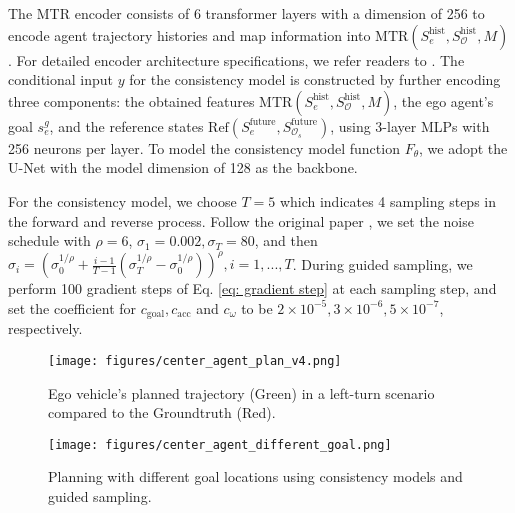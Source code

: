 The MTR encoder consists of 6 transformer layers with a dimension of 256 to encode agent trajectory histories and map information into $\text{MTR}(S_e^{\text{hist}}, S_\mathcal{O}^{\text{hist}}, M)$.
For detailed encoder architecture specifications, we refer readers to \cite{shi2022motion}.
The conditional input $y$ for the consistency model is constructed by further encoding three components: the obtained features $\text{MTR}(S_e^{\text{hist}}, S_\mathcal{O}^{\text{hist}}, M)$, the ego agent's goal $s_e^g$, and the reference states $\text{Ref}(S_e^{\text{future}}, S_{\mathcal{O}_s}^{\text{future}})$, using 3-layer MLPs with 256 neurons per layer.
To model the consistency model function $F_\theta$, we adopt the U-Net \citep{ronneberger2015u} with the model dimension of 128 as the backbone.

For the consistency model, we choose $T=5$ which indicates 4 sampling steps in the forward and reverse process.
Follow the original paper \citep{song2023improved}, we set the noise schedule with $\rho = 6$, $\sigma_1 = 0.002, \sigma_T=80$, and then $\sigma_i = \left(\sigma_{0}^{1/\rho} + \frac{i-1}{T-1}(\sigma_{T}^{1/\rho} - \sigma_{0}^{1/\rho})\right)^\rho, i = 1, ..., T$.
During guided sampling, we perform 100 gradient steps of Eq. \eqref{eq: gradient step} at each sampling step, and set the coefficient for $c_{\text{goal}}, c_{\text{acc}}$ and $c_{\omega}$ to be $2\times10^{-5}, 3\times10^{-6}, 5\times10^{-7}$, respectively.


\begin{figure*}[!t]
    \centering
\texttt{[image: figures/center\_agent\_plan\_v4.png]}
    \caption{
    Ego vehicle's planned trajectory (Green) in a left-turn scenario compared to the Groundtruth (Red).
    } 
    \label{fig: ego agent's planned trajectory}
\end{figure*}

\begin{figure}[t]
    \centering
    \texttt{[image: figures/center\_agent\_different\_goal.png]}
    \caption{
    Planning with different goal locations using consistency models and guided sampling.}
    \label{fig: different goal}
\end{figure}

